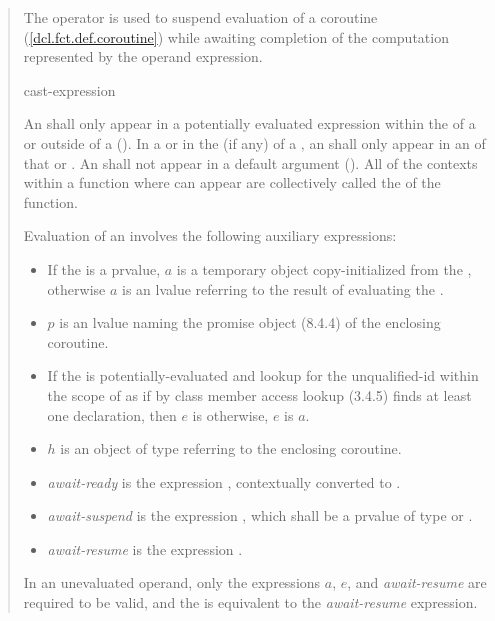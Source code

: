 \begin{quote}
\pnum
The  operator is used to suspend evaluation of a 
coroutine (\ref{dcl.fct.def.coroutine}) while awaiting completion of the computation represented by the operand expression.

\begin{bnf}
  \br
   cast-expression
\end{bnf}

\pnum
An  shall only appear in a potentially evaluated expression within the  of a  or 
 outside of a  (). In a  or in the  (if any) of a , an  shall only appear in an  of that  or .
An  shall not appear in a default argument (). All of the contexts within a function where  can appear are collectively called the  of the function.

\pnum
Evaluation of an  involves the following auxiliary expressions:

\begin{itemize}
  \item If the  is a prvalue, $a$ is a temporary object copy-initialized from the , otherwise $a$ is an lvalue referring to the result of evaluating the .
  \item $p$ is an lvalue naming the promise object (8.4.4) of the enclosing coroutine.
  \item If the  is potentially-evaluated and lookup for the unqualified-id  within the scope of  as if by class member access lookup (3.4.5) finds at least one declaration, then $e$ is  otherwise, $e$ is $a$.
  \item $h$ is an object of type  referring to the enclosing coroutine.
  \item \textit{await-ready} is the expression , contextually converted to .
  \item \textit{await-suspend} is the expression , which shall be a prvalue of type  or .
  \item \textit{await-resume} is the expression .
\end{itemize}
In an unevaluated operand, only the expressions $a$, $e$, and \textit{await-resume} are required to be valid, and the  is equivalent to the \textit{await-resume} expression.


\end{quote}

